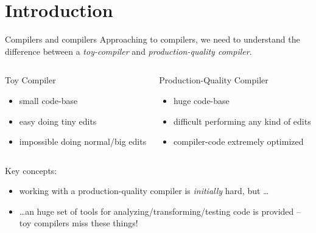 \documentclass[10pt,mathserif]{beamer}
\begin{document}
\section{Introduction}
\begin{frame}{Compilers and compilers}
	Approaching to compilers, we need to understand the difference between a
	\emph{toy-compiler} and \emph{production-quality compiler}.
	\begin{columns}[t]
		\begin{block}{Toy Compiler}
			\begin{itemize}
				\item small code-base
				\item easy doing tiny edits
				\item impossible doing normal/big edits
			\end{itemize}
		\end{block}
		
		\begin{block}{Production-Quality Compiler}
			\begin{itemize}
				\item huge code-base
				\item difficult performing any kind of edits
				\item compiler-code extremely optimized
			\end{itemize}
		\end{block}
	\end{columns}
	
	\vfill
	Key concepts:
	
	\begin{itemize}
		\item working with a production-quality compiler is \emph{initially} \alert{hard},
		but \ldots
		\item \ldots an huge set of tools for analyzing/transforming/testing code
		is provided -- toy compilers \alert{miss these things}!
	\end{itemize}
\end{frame}
\end{document}
